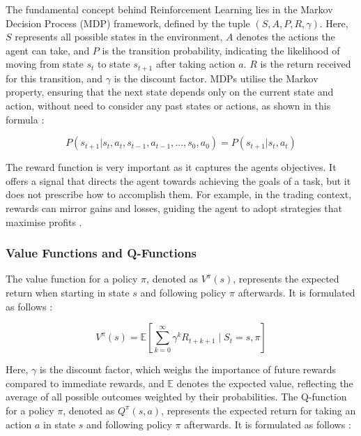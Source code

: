 The fundamental concept behind Reinforcement Learning lies in the Markov Decision Process (MDP) framework, defined by the tuple \( (S, A, P, R, \gamma) \). Here, \( S \) represents all possible states in the environment, \( A \) denotes the actions the agent can take, and \( P \) is the transition probability, indicating the likelihood of moving from state \( s_t \) to state \( s_{t+1} \) after taking action \( a \). \( R \) is the return received for this transition, and \( \gamma \) is the discount factor. MDPs utilise the Markov property, ensuring that the next state depends only on the current state and action, without need to consider any past states or actions, as shown in this formula \cite{sutton_reinforcement_2018}:

\begin{equation}
\label{Equation:MarkovProperty}
P(s_{t+1} | s_t, a_t, s_{t-1}, a_{t-1}, \ldots, s_0, a_0) = P(s_{t+1} | s_t, a_t)
\end{equation}

The reward function is very important as it captures the agents objectives. It offers a signal that directs the agent towards achieving the goals of a task, but it does not prescribe how to accomplish them. For example, in the trading context, rewards can mirror gains and losses, guiding the agent to adopt strategies that maximise profits \cite{sutton_reinforcement_2018}.

\subsubsection{Value Functions and Q-Functions}

The value function for a policy \( \pi \), denoted as \( V^\pi(s) \), represents the expected return when starting in state \( s \) and following policy \( \pi \) afterwards. It is formulated as follows \cite{sutton_reinforcement_2018}:

\begin{equation}
V^\pi(s) = \mathbb{E} \left[ \sum_{k=0}^{\infty} \gamma^k R_{t+k+1} \mid S_t = s, \pi \right]
\end{equation}

Here, \( \gamma \) is the discount factor, which weighs the importance of future rewards compared to immediate rewards, and \( \mathbb{E} \) denotes the expected value, reflecting the average of all possible outcomes weighted by their probabilities. The Q-function for a policy \( \pi \), denoted as \( Q^\pi(s, a) \), represents the expected return for taking an action \( a \) in state \( s \) and following policy \( \pi \) afterwards. It is formulated as follows \cite{sutton_reinforcement_2018}:

